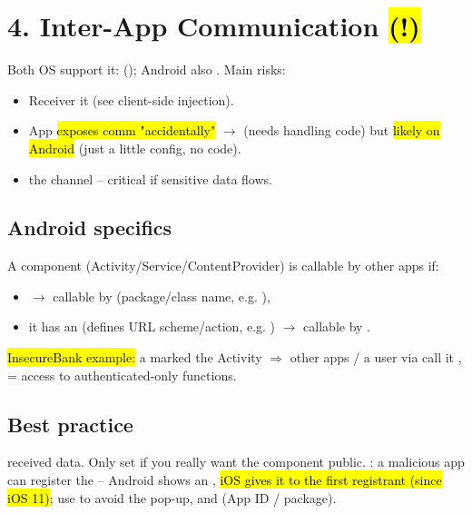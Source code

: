\section{4. Inter-App Communication \hl{(!)}}
Both OS support it:  (); Android also . Main risks:
\begin{itemize}
\item Receiver  it (see client-side injection).
\item App \hl{exposes comm "accidentally"} $\to$  (needs handling code) but \hl{likely on Android} (just a little  config, no code).
\item {} the channel -- critical if sensitive data flows.
\end{itemize}
\subsection{Android specifics}
A component (Activity/Service/ContentProvider) is callable by other apps if:
\begin{itemize}
\item {} $\to$ callable by  (package/class name, e.g. ), 
\item it has an  (defines URL scheme/action, e.g. ) $\to$ callable by .
\end{itemize}
\begin{defbox}
\hl{InsecureBank example:} a  marked the  Activity  $\Rightarrow$ other apps / a user via  call it ,  = access to authenticated-only functions.
\end{defbox}
\subsection{Best practice}
 received data. Only set  if you really want the component public. : a malicious app can register the  -- Android shows an , \hl{iOS gives it to the first registrant (since iOS 11)}; use  to avoid the pop-up, and  (App ID / package).

